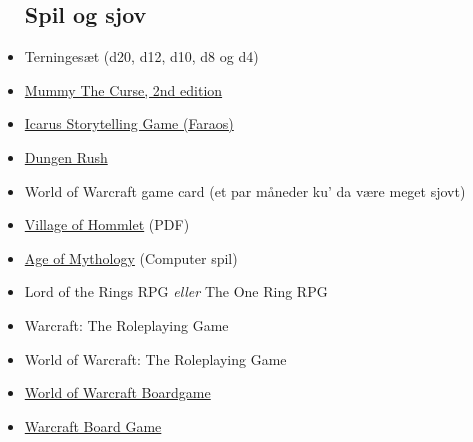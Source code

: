 \begin{itemize}
    \subsection{Spil og sjov}
    \item Terningesæt (d20, d12, d10, d8 og d4)
    \item \href{https://www.kickstarter.com/projects/339646881/mummy-the-curse-2nd-edition}{Mummy The Curse, 2nd edition}
    \item \href{https://www.faraos.dk/games/braetspil/g-h-i/i/i/icarus-a-storytelling-game-about-how-great-civilizations-fall}{Icarus Storytelling Game (Faraos)}
    \item \href{https://boardgamegeek.com/boardgame/207338/dungeon-rush}{Dungen Rush}
    \item World of Warcraft game card (et par måneder ku' da være meget sjovt)
    \item \href{https://www.dmsguild.com/product/17067/T1-The-Village-of-Hommlet-1e}{Village of Hommlet} (PDF)
    \item \href{https://store.steampowered.com/app/266840/Age_of_Mythology_Extended_Edition/}{Age of Mythology} (Computer spil)
    \item Lord of the Rings RPG \textit{eller} The One Ring RPG
    \item Warcraft: The Roleplaying Game
    \item World of Warcraft: The Roleplaying Game
    \item \href{https://boardgamegeek.com/boardgame/17223/world-warcraft-boardgame}{World of Warcraft Boardgame}
    \item \href{https://boardgamegeek.com/boardgame/7479/warcraft-board-game}{Warcraft Board Game}
\end{itemize}